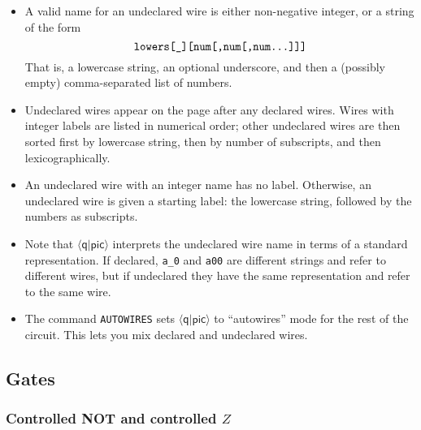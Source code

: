 \documentclass[twoside,12pt]{article}
\newcommand{\qpic}{$\langle\mathsf{q}|\mathsf{pic}\rangle$\xspace}
\begin{document}
\begin{itemize}
\item A valid name for an undeclared wire is either non-negative integer,
  or a string of the form
  $$
  \text{\tt lowers[\_][num[,num[,num...]]]}
  $$
  That is, a lowercase string, an optional underscore, and then a (possibly empty)
  comma-separated list of numbers.
\item Undeclared wires appear on the page after any declared wires.  Wires with integer
  labels are listed in numerical order; other undeclared wires are then sorted first by
  lowercase string, then by number of subscripts, and then lexicographically.
\item An undeclared wire with an integer name has no label.
  Otherwise, an undeclared wire is given a starting label: the
  lowercase string, followed by the numbers as subscripts.
\item Note that \qpic interprets the undeclared wire name in terms of a
standard representation.  If
  declared, {\tt a\_0} and {\tt a00} are different strings and refer to different wires,
  but if undeclared they have the same representation and refer to the same wire.
\item The command {\tt AUTOWIRES} sets \qpic to ``autowires'' mode for the rest
  of the circuit.  This lets you mix declared and undeclared wires.
\end{itemize}

\subsection{Gates}

\subsubsection{Controlled NOT and controlled $Z$}
\end{document}
